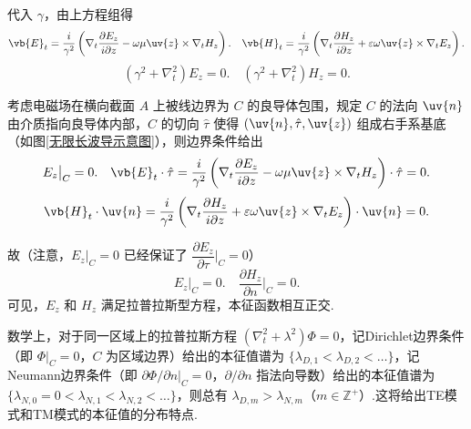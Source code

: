 代入 \(\gamma\)，由上方程组得
\begin{equation*}
	\vb{E}_t = \dfrac{i}{\gamma^2} \left( \nabla_t \dfrac{\partial E_z}{i\partial z} - \omega\mu \uv{z} \times \nabla_t H_z \right). \quad \vb{H}_t = \dfrac{i}{\gamma^2} \left( \nabla_t \dfrac{\partial H_z}{i\partial z} + \varepsilon\omega \uv{z} \times \nabla_t E_z \right).
\end{equation*}
\begin{equation*}
	(\gamma^2 + \nabla_t^2) E_z = 0. \quad (\gamma^2 + \nabla_t^2) H_z = 0.
\end{equation*}

考虑电磁场在横向截面 \(A\) 上被线边界为 \(C\) 的良导体包围，规定 \(C\) 的法向 \(\uv{n}\) 由介质指向良导体内部，\(C\) 的切向 \(\hat{\tau}\) 使得 \((\uv{n}, \hat{\tau}, \uv{z})\) 组成右手系基底（如图\ref{无限长波导示意图}），则边界条件给出
\begin{equation*}
	E_z \big|_C = 0. \quad \vb{E}_t \cdot \hat{\tau} = \dfrac{i}{\gamma^2} \left( \nabla_t \dfrac{\partial E_z}{i\partial z} - \omega\mu \uv{z} \times \nabla_t H_z \right) \cdot \hat{\tau} = 0.
\end{equation*}
\begin{equation*}
	\vb{H}_t \cdot \uv{n} = \dfrac{i}{\gamma^2} \left( \nabla_t \dfrac{\partial H_z}{i\partial z} + \varepsilon\omega \uv{z} \times \nabla_t E_z \right) \cdot \uv{n} = 0.
\end{equation*}

故（注意，\(E_z \big|_C = 0\) 已经保证了 \(\dfrac{\partial E_z}{\partial \tau} \big|_C = 0\)）
\begin{equation*}
	E_z \big|_C = 0. \quad \dfrac{\partial H_z}{\partial n} \big|_C = 0.
\end{equation*}
可见，\(E_z\) 和 \(H_z\) 满足拉普拉斯型方程，本征函数相互正交.
\begin{notes}
	数学上，对于同一区域上的拉普拉斯方程 \((\nabla_t^2 + \lambda^2) \Phi = 0\)，记Dirichlet边界条件（即 \(\Phi \big|_C = 0\)，\(C\) 为区域边界）给出的本征值谱为 \(\{\lambda_{D,1} < \lambda_{D,2} < \dots\}\)，记Neumann边界条件（即 \(\partial \Phi/\partial n \big|_C = 0\)，\(\partial/\partial n\) 指法向导数）给出的本征值谱为 \(\{\lambda_{N,0} = 0 < \lambda_{N,1} < \lambda_{N,2} < \dots\}\)，则总有 \(\lambda_{D,m} > \lambda_{N,m}\)（\(m \in \mathbb{Z}^+\)）.这将给出TE模式和TM模式的本征值的分布特点.
\end{notes}

